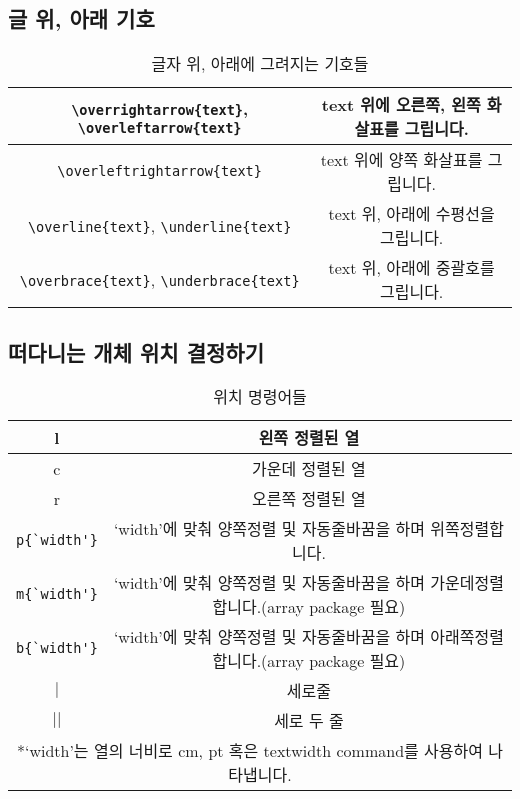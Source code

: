 \subsection{글 위, 아래 기호}
\begin{table}[hp]
	\centering
	\begin{tabular}{|c|c|}
		\hline
		\verb|\overrightarrow{text}|, \verb|\overleftarrow{text}| & text 위에 오른쪽, 왼쪽 화살표를 그립니다.\\
		\hline
		\verb|\overleftrightarrow{text}| & text 위에 양쪽 화살표를 그립니다.\\
		\hline
		\verb|\overline{text}|, \verb|\underline{text}| & text 위, 아래에 수평선을 그립니다.\\
		\hline
		\verb|\overbrace{text}|, \verb|\underbrace{text}| & text 위, 아래에 중괄호를 그립니다.\\
		\hline
	\end{tabular}
	\caption{글자 위, 아래에 그려지는 기호들}
	\label{tab:overunder}
\end{table}

\subsection{떠다니는 개체 위치 결정하기}
\begin{table}[hp]
	\centering
	\begin{tabular}{|c|c|}
		\hline
		l & 왼쪽 정렬된 열\\
		\hline
		c & 가운데 정렬된 열\\
		\hline
		r & 오른쪽 정렬된 열\\
		\hline
		\verb|p{`width'}| & `width'에 맞춰 양쪽정렬 및 자동줄바꿈을 하며 위쪽정렬합니다.\\
		\hline
		\verb|m{`width'}| & `width'에 맞춰 양쪽정렬 및 자동줄바꿈을 하며 가운데정렬합니다.(array package 필요)\\
		\hline
		\verb|b{`width'}| & `width'에 맞춰 양쪽정렬 및 자동줄바꿈을 하며 아래쪽정렬합니다.(array package 필요)\\
		\hline
		$\mid$ & 세로줄\\
		\hline
		$\mid$$\mid$ & 세로 두 줄\\
		\hline
		\multicolumn{2}{c}{*`width'는 열의 너비로 cm, pt 혹은 textwidth command를 사용하여 나타냅니다.}
	\end{tabular}
	\caption{위치 명령어들}
	\label{tab:pos}
\end{table}

